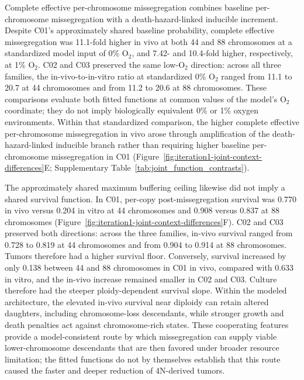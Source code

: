 \documentclass[11pt]{article}
\begin{document}
Complete effective per-chromosome missegregation combines baseline per-chromosome missegregation with a death-hazard-linked inducible increment. Despite C01's approximately shared baseline probability, complete effective missegregation was 11.1-fold higher in vivo at both 44 and 88 chromosomes at a standardized model input of 0\% O$_2$, and 7.42- and 10.4-fold higher, respectively, at 1\% O$_2$. C02 and C03 preserved the same low-O$_2$ direction: across all three families, the in-vivo-to-in-vitro ratio at standardized 0\% O$_2$ ranged from 11.1 to 20.7 at 44 chromosomes and from 11.2 to 20.6 at 88 chromosomes. These comparisons evaluate both fitted functions at common values of the model's O$_2$ coordinate; they do not imply biologically equivalent 0\% or 1\% oxygen environments. Within that standardized comparison, the higher complete effective per-chromosome missegregation in vivo arose through amplification of the death-hazard-linked inducible branch rather than requiring higher baseline per-chromosome missegregation in C01 (Figure~\ref{fig:iteration1-joint-context-differences}E; Supplementary Table~\ref{tab:joint_function_contrasts}).

The approximately shared maximum buffering ceiling likewise did not imply a shared survival function. In C01, per-copy post-missegregation survival was 0.770 in vivo versus 0.204 in vitro at 44 chromosomes and 0.908 versus 0.837 at 88 chromosomes (Figure~\ref{fig:iteration1-joint-context-differences}F). C02 and C03 preserved both directions: across the three families, in-vivo survival ranged from 0.728 to 0.819 at 44 chromosomes and from 0.904 to 0.914 at 88 chromosomes. Tumors therefore had a higher survival floor. Conversely, survival increased by only 0.138 between 44 and 88 chromosomes in C01 in vivo, compared with 0.633 in vitro, and the in-vivo increase remained smaller in C02 and C03. Culture therefore had the steeper ploidy-dependent survival slope. Within the modeled architecture, the elevated in-vivo survival near diploidy can retain altered daughters, including chromosome-loss descendants, while stronger growth and death penalties act against chromosome-rich states. These cooperating features provide a model-consistent route by which missegregation can supply viable lower-chromosome descendants that are then favored under broader resource limitation; the fitted functions do not by themselves establish that this route caused the faster and deeper reduction of 4N-derived tumors.
\end{document}
